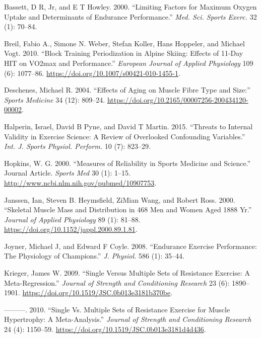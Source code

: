 \documentclass[
  letterpaper,
  DIV=11,
  numbers=noendperiod]{scrreprt}
\newlength{\cslhangindent}
\newenvironment{CSLReferences}[2] %
 {\begin{list}{}{%
  \setlength{\itemindent}{0pt}
  \setlength{\leftmargin}{0pt}
  \setlength{\parsep}{0pt}
  \ifodd #1
   \setlength{\leftmargin}{\cslhangindent}
   \setlength{\itemindent}{-1\cslhangindent}
  \fi
  \setlength{\itemsep}{#2\baselineskip}}}
 {\end{list}}
\begin{document}
\label{refs}
\begin{CSLReferences}{1}{0}
Bassett, D R, Jr, and E T Howley. 2000. {``Limiting Factors for Maximum
Oxygen Uptake and Determinants of Endurance Performance.''} \emph{Med.
Sci. Sports Exerc.} 32 (1): 70--84.

Breil, Fabio A., Simone N. Weber, Stefan Koller, Hans Hoppeler, and
Michael Vogt. 2010. {``Block Training Periodization in Alpine Skiing:
Effects of 11-Day HIT on VO2max and Performance.''} \emph{European
Journal of Applied Physiology} 109 (6): 1077--86.
\url{https://doi.org/10.1007/s00421-010-1455-1}.

Deschenes, Michael R. 2004. {``Effects of Aging on Muscle Fibre Type and
Size:''} \emph{Sports Medicine} 34 (12): 809--24.
\url{https://doi.org/10.2165/00007256-200434120-00002}.

Halperin, Israel, David B Pyne, and David T Martin. 2015. {``Threats to
Internal Validity in Exercise Science: A Review of Overlooked
Confounding Variables.''} \emph{Int. J. Sports Physiol. Perform.} 10
(7): 823--29.

Hopkins, W. G. 2000. {``Measures of Reliability in Sports Medicine and
Science.''} Journal Article. \emph{Sports Med} 30 (1): 1--15.
\url{http://www.ncbi.nlm.nih.gov/pubmed/10907753}.

Janssen, Ian, Steven B. Heymsfield, ZiMian Wang, and Robert Ross. 2000.
{``Skeletal Muscle Mass and Distribution in 468 Men and Women Aged
18{\textendash}88 Yr.''} \emph{Journal of Applied Physiology} 89 (1):
81--88. \url{https://doi.org/10.1152/jappl.2000.89.1.81}.

Joyner, Michael J, and Edward F Coyle. 2008. {``Endurance Exercise
Performance: The Physiology of Champions.''} \emph{J. Physiol.} 586 (1):
35--44.

Krieger, James W. 2009. {``Single Versus Multiple Sets of Resistance
Exercise: A Meta-Regression.''} \emph{Journal of Strength and
Conditioning Research} 23 (6): 1890--1901.
\url{https://doi.org/10.1519/JSC.0b013e3181b370be}.

---------. 2010. {``Single Vs. Multiple Sets of Resistance Exercise for
Muscle Hypertrophy: A Meta-Analysis.''} \emph{Journal of Strength and
Conditioning Research} 24 (4): 1150--59.
\url{https://doi.org/10.1519/JSC.0b013e3181d4d436}.


\end{CSLReferences}
\end{document}

